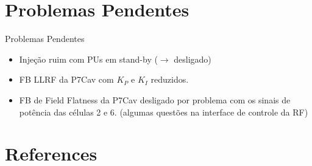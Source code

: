 \documentclass{beamer}					  %
\begin{document}
\section{Problemas Pendentes}

\begin{frame}{Problemas Pendentes}
    \vspace{0.4 cm}
    \large{
    \begin{itemize}
            \item Injeção ruim com PUs em stand-by ($\rightarrow$ desligado) \vspace{0.5cm}
            \item FB LLRF da P7Cav com $K_P$ e $K_I$ reduzidos. \vspace{0.5cm}
            \item FB de Field Flatness da P7Cav desligado por problema com os sinais de potência das células 2 e 6. (algumas questões na interface de controle da RF)
    \end{itemize}
    }
\end{frame}



\section{References}
\end{document}
